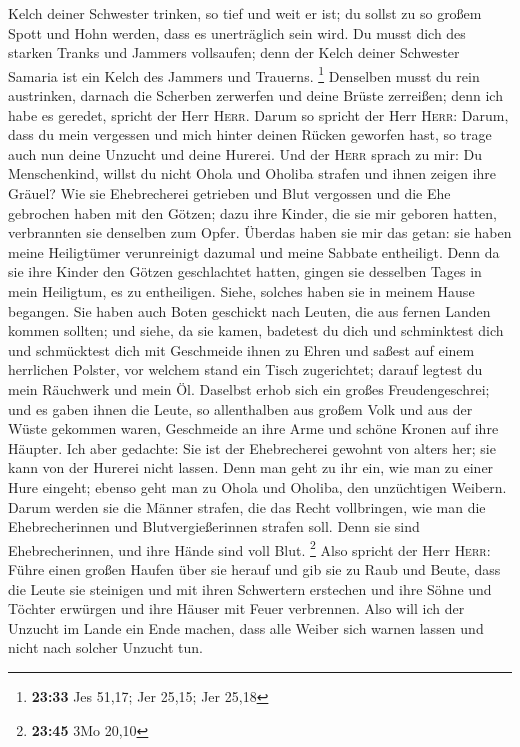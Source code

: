 Kelch deiner Schwester trinken, so tief und weit er ist; du sollst zu so
großem Spott und Hohn werden, dass es unerträglich sein wird.
 Du musst dich des starken Tranks und Jammers vollsaufen;
denn der Kelch deiner Schwester Samaria ist ein Kelch des Jammers und
Trauerns. \footnote{\textbf{23:33} Jes 51,17; Jer 25,15; Jer 25,18}
 Denselben musst du rein austrinken, darnach die Scherben
zerwerfen und deine Brüste zerreißen; denn ich habe es geredet, spricht
der Herr \textsc{Herr}.  Darum so spricht der Herr
\textsc{Herr}: Darum, dass du mein vergessen und mich hinter deinen
Rücken geworfen hast, so trage auch nun deine Unzucht und deine Hurerei.
 Und der \textsc{Herr} sprach zu mir: Du Menschenkind,
willst du nicht Ohola und Oholiba strafen und ihnen zeigen ihre Gräuel?
 Wie sie Ehebrecherei getrieben und Blut vergossen und
die Ehe gebrochen haben mit den Götzen; dazu ihre Kinder, die sie mir
geboren hatten, verbrannten sie denselben zum Opfer. 
Überdas haben sie mir das getan: sie haben meine Heiligtümer
verunreinigt dazumal und meine Sabbate entheiligt.  Denn
da sie ihre Kinder den Götzen geschlachtet hatten, gingen sie desselben
Tages in mein Heiligtum, es zu entheiligen. Siehe, solches haben sie in
meinem Hause begangen.  Sie haben auch Boten geschickt
nach Leuten, die aus fernen Landen kommen sollten; und siehe, da sie
kamen, badetest du dich und schminktest dich und schmücktest dich mit
Geschmeide ihnen zu Ehren  und saßest auf einem
herrlichen Polster, vor welchem stand ein Tisch zugerichtet; darauf
legtest du mein Räuchwerk und mein Öl.  Daselbst erhob
sich ein großes Freudengeschrei; und es gaben ihnen die Leute, so
allenthalben aus großem Volk und aus der Wüste gekommen waren,
Geschmeide an ihre Arme und schöne Kronen auf ihre Häupter.
 Ich aber gedachte: Sie ist der Ehebrecherei gewohnt von
alters her; sie kann von der Hurerei nicht lassen.  Denn
man geht zu ihr ein, wie man zu einer Hure eingeht; ebenso geht man zu
Ohola und Oholiba, den unzüchtigen Weibern.  Darum werden
sie die Männer strafen, die das Recht vollbringen, wie man die
Ehebrecherinnen und Blutvergießerinnen strafen soll. Denn sie sind
Ehebrecherinnen, und ihre Hände sind voll Blut. \footnote{\textbf{23:45}
  3Mo 20,10}  Also spricht der Herr \textsc{Herr}: Führe
einen großen Haufen über sie herauf und gib sie zu Raub und Beute,
 dass die Leute sie steinigen und mit ihren Schwertern
erstechen und ihre Söhne und Töchter erwürgen und ihre Häuser mit Feuer
verbrennen.  Also will ich der Unzucht im Lande ein Ende
machen, dass alle Weiber sich warnen lassen und nicht nach solcher
Unzucht tun.

